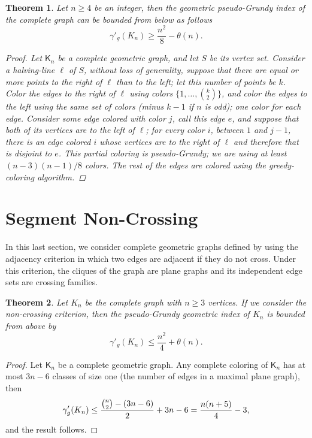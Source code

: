 \documentclass[11pt]{article}
\newtheorem{theorem}{Theorem}
\begin{document}
\begin{theorem}
Let $n\geq 4$ be an integer, then the geometric pseudo-Grundy index of the complete graph can be bounded from below as follows
\[\gamma'_g(K_n)\geq \frac{n^2}{8}-\theta(n).\]
\begin{proof}
Let $\mathsf{K}_n$ be a complete geometric graph, and let $S$ be its vertex set. Consider a halving-line $\ell$ of $S$, without loss of generality, suppose that there are equal or more points to the right of $\ell$ than to the left; let this number of points be $k$. Color the edges to the right of $\ell$ using colors $\{1, \ldots, {k \choose 2}\}$, and color the edges to the left using the same set of colors (minus $k-1$ if $n$ is odd); one color for each edge. Consider some edge colored with color $j$, call this edge $e$, and suppose that both of its vertices are to the left of $\ell$; for every color $i$, between $1$ and $j-1$, there is an edge colored $i$ whose vertices are to the right of $\ell$ and therefore that is disjoint to $e$. This partial coloring is pseudo-Grundy; we are using at least $(n-3)(n-1)/8$ colors. The rest of the edges are colored using the greedy-coloring algorithm. 
\end{proof}
\end{theorem}


\section{Segment Non-Crossing}\label{sec:non-crossing}
In this last section, we consider complete geometric graphs defined by using the adjacency criterion in which two edges are adjacent if they do not cross. Under this criterion, the cliques of the graph are plane graphs and its independent edge sets are crossing families. %


\begin{theorem}
Let $K_n$ be the complete graph with $n\geq 3$ vertices. If we consider the non-crossing criterion, then the pseudo-Grundy geometric index of $K_n$ is bounded from above by
\[\gamma'_g(K_n)\leq \frac{n^2}{4}+\theta(n).\]
\end{theorem}
\begin{proof}
Let $\mathsf{K}_n$ be a complete geometric graph. Any complete coloring of $\mathsf{K}_n$ has at most $3n-6$ classes of size one (the number of edges in a maximal plane graph), then \[\gamma'_g(K_n)\leq \frac{\tbinom{n}{2}-(3n-6)}{2}+3n-6= \frac{n(n+5)}{4}-3,\]%
and the result follows.
\end{proof}
\end{document}
